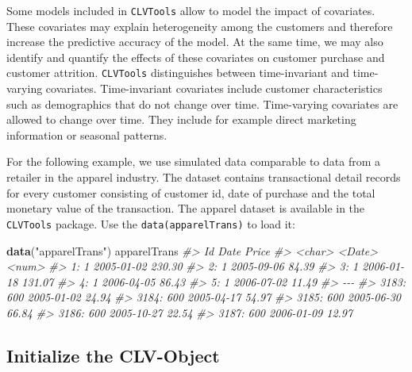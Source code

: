 \documentclass[
]{article}
\newenvironment{Shaded}{\begin{snugshade}}{\end{snugshade}}
\newcommand{\CommentTok}[1]{\textcolor[rgb]{0.56,0.35,0.01}{\textit{#1}}}
\newcommand{\FunctionTok}[1]{\textcolor[rgb]{0.13,0.29,0.53}{\textbf{#1}}}
\newcommand{\NormalTok}[1]{#1}
\newcommand{\StringTok}[1]{\textcolor[rgb]{0.31,0.60,0.02}{#1}}
\begin{document}
Some models included in \texttt{CLVTools} allow to model the impact of
covariates. These covariates may explain heterogeneity among the
customers and therefore increase the predictive accuracy of the model.
At the same time, we may also identify and quantify the effects of these
covariates on customer purchase and customer attrition.
\texttt{CLVTools} distinguishes between time-invariant and time-varying
covariates. Time-invariant covariates include customer characteristics
such as demographics that do not change over time. Time-varying
covariates are allowed to change over time. They include for example
direct marketing information or seasonal patterns.

For the following example, we use simulated data comparable to data from
a retailer in the apparel industry. The dataset contains transactional
detail records for every customer consisting of customer id, date of
purchase and the total monetary value of the transaction. The apparel
dataset is available in the \texttt{CLVTools} package. Use the
\texttt{data(apparelTrans)} to load it:

\begin{Shaded}
\begin{Highlighting}[]
\FunctionTok{data}\NormalTok{(}\StringTok{"apparelTrans"}\NormalTok{)}
\NormalTok{apparelTrans}
\CommentTok{\#\textgreater{}           Id       Date  Price}
\CommentTok{\#\textgreater{}       \textless{}char\textgreater{}     \textless{}Date\textgreater{}  \textless{}num\textgreater{}}
\CommentTok{\#\textgreater{}    1:      1 2005{-}01{-}02 230.30}
\CommentTok{\#\textgreater{}    2:      1 2005{-}09{-}06  84.39}
\CommentTok{\#\textgreater{}    3:      1 2006{-}01{-}18 131.07}
\CommentTok{\#\textgreater{}    4:      1 2006{-}04{-}05  86.43}
\CommentTok{\#\textgreater{}    5:      1 2006{-}07{-}02  11.49}
\CommentTok{\#\textgreater{}   {-}{-}{-}                         }
\CommentTok{\#\textgreater{} 3183:    600 2005{-}01{-}02  24.94}
\CommentTok{\#\textgreater{} 3184:    600 2005{-}04{-}17  54.97}
\CommentTok{\#\textgreater{} 3185:    600 2005{-}06{-}30  66.84}
\CommentTok{\#\textgreater{} 3186:    600 2005{-}10{-}27  22.54}
\CommentTok{\#\textgreater{} 3187:    600 2006{-}01{-}09  12.97}
\end{Highlighting}
\end{Shaded}

\subsection{Initialize the CLV-Object}\label{clvdata}
\end{document}
